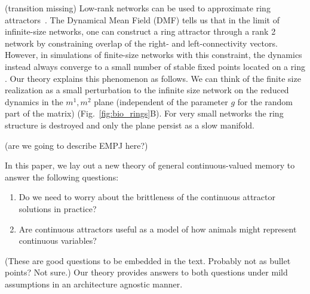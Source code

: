 \documentclass{article} %
\newcommand{\mpcomment}[1]{\textcolor{mpcolor}{(#1)}}
\newcounter{ct}
\theoremstyle{definition}
\theoremstyle{remark}
\begin{document}
\mpcomment{transition missing}
Low-rank networks can be used to approximate ring attractors~\citep{mastrogiuseppe2018, beiran2021}.
The Dynamical Mean Field (DMF) tells us that in the limit of infinite-size networks, one can construct a ring attractor through a rank 2 network by constraining overlap of the right- and left-connectivity vectors.
However, in simulations of finite-size networks with this constraint, the dynamics instead always converge to a small number of stable fixed points located on a ring \citep{mastrogiuseppe2018}.
Our theory explains this phenomenon as follows. %
We can think of the finite size realization as a small perturbation to the infinite size network on the reduced dynamics in the $m^1, m^2$ plane (independent of the parameter $g$ for the random part of the matrix)  (Fig.~\ref{fig:bio_rings}B).
For very small networks the ring structure is destroyed and only the plane persist as a slow manifold.

\mpcomment{are we going to describe EMPJ here?}




In this paper, we lay out a new theory of general continuous-valued memory to answer the following questions:
\begin{enumerate}
    \item Do we need to worry about the brittleness of the continuous attractor solutions in practice?
    \item Are continuous attractors useful as a model of how animals might represent continuous variables?
\end{enumerate}
\mpcomment{These are good questions to be embedded in the text. Probably not as bullet points? Not sure.}
Our theory provides answers to both questions under mild assumptions in an architecture agnostic manner.
\end{document}
